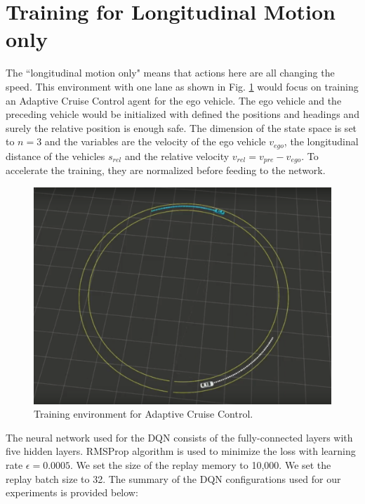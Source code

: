 \section{Training for Longitudinal Motion only}

The ``longitudinal motion only" means that actions here are all changing the speed. This environment with one lane as shown in Fig. \ref{fig:acc-env} would focus on training an Adaptive Cruise Control agent for the ego vehicle. The ego vehicle and the preceding vehicle would be initialized with defined the positions and headings and surely the relative position is enough safe. The dimension of the state space is set to $n = 3$ and the variables are the velocity of the ego vehicle $v_{ego}$, the longitudinal distance of the vehicles $s_{rel}$ and the relative velocity $v_{rel} = v_{pre} - v_{ego}$. To accelerate the training, they are normalized before feeding to the network.

\begin{figure}[h]
\centering
\includegraphics[width=1.0\textwidth]{figs/ch5/acc-env}
\caption{Training environment for Adaptive Cruise Control.}
\label{fig:acc-env}
\end{figure}

The neural network used for the DQN consists of the fully-connected layers with five hidden layers. RMSProp algorithm is used to minimize the loss with learning rate $\epsilon = 0.0005$. We set the size of the replay memory to 10,000. We set the replay batch size to 32. The summary of the DQN configurations used for our experiments is provided below:

